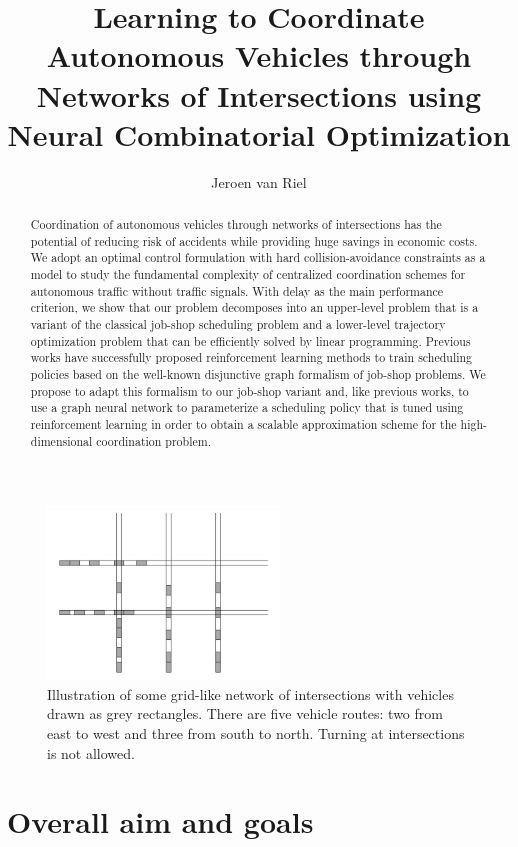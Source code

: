 \documentclass[notitlepage]{report}
\title{Learning to Coordinate Autonomous Vehicles through Networks of Intersections using Neural Combinatorial Optimization}
\author{Jeroen van Riel}
\begin{document}
\maketitle
\begin{abstract}
  Coordination of autonomous vehicles through networks of
  intersections has the potential of reducing risk of accidents while providing
  huge savings in economic costs.
  We adopt an optimal control formulation with hard collision-avoidance
  constraints as a model to study the fundamental complexity of centralized
  coordination schemes for autonomous traffic without traffic signals. With
  delay as the main performance criterion, we show that our problem decomposes
  into an upper-level problem that is a variant of the classical job-shop
  scheduling problem and a lower-level trajectory optimization problem that can
  be efficiently solved by linear programming.
  Previous works have successfully proposed reinforcement learning methods to
  train scheduling policies based on the well-known disjunctive graph formalism
  of job-shop problems.
  We propose to adapt this formalism to our job-shop variant and, like previous
  works, to use a graph neural network to parameterize a scheduling policy that
  is tuned using reinforcement learning in order to obtain a scalable
  approximation scheme for the high-dimensional coordination problem.
\end{abstract}


\begin{figure}
  \centering
  \includegraphics[width=0.55\textwidth]{figures/state_example.png}
  \caption{Illustration of some grid-like network of intersections with vehicles
    drawn as grey rectangles. There are five vehicle routes: two from east to
    west and three from south to north. Turning at intersections is not
    allowed.}\label{fig:network_illustration}
\end{figure}

\section*{Overall aim and goals}
\end{document}
